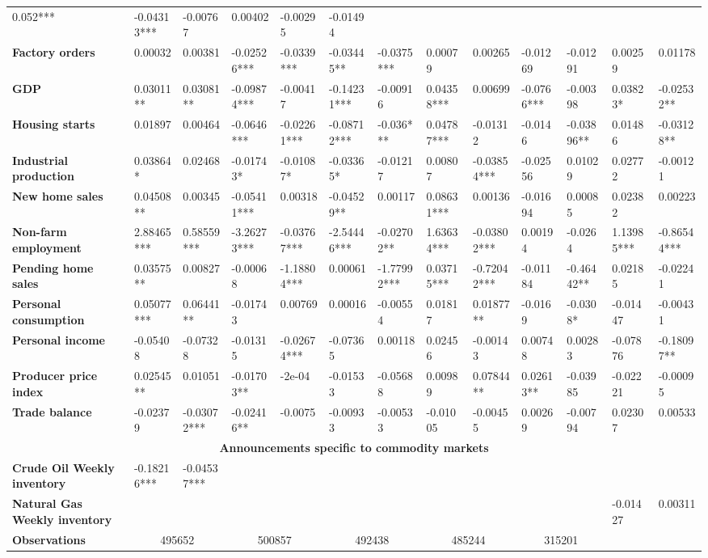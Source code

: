 \begin{sidewaystable}
{\begin{tabular}{@{}lllllllllllll@{}}
0.052*** & -0.04313*** & -0.00767 & 0.00402 & -0.00295 & -0.01494 \\ \textbf{Factory orders}& 0.00032 & 0.00381 & -0.02526*** & -0.0339*** & -0.03445** & -0.0375*** & 0.00079 & 0.00265 & -0.01269 & -0.01291 & 0.00259 & 0.01178 \\ \textbf{GDP}& 0.03011** & 0.03081** & -0.09874*** & -0.00417 & -0.14231*** & -0.00916 & 0.04358*** & 0.00699 & -0.0766*** & -0.00398 & 0.03823* & -0.02532** \\ \textbf{Housing starts}& 0.01897 & 0.00464 & -0.0646*** & -0.02261*** & -0.08712*** & -0.036*** & 0.04787*** & -0.01312 & -0.0146 & -0.03896** & 0.01486 & -0.03128** \\ \textbf{Industrial production}& 0.03864* & 0.02468 & -0.01743* & -0.01087* & -0.03365* & -0.01217 & 0.00807 & -0.03854*** & -0.02556 & 0.01029 & 0.02772 & -0.00121 \\ \textbf{New home sales}& 0.04508** & 0.00345 & -0.05411*** & 0.00318 & -0.04529** & 0.00117 & 0.08631*** & 0.00136 & -0.01694 & 0.00085 & 0.02382 & 0.00223 \\ \textbf{Non-farm employment}& 2.88465*** & 0.58559*** & -3.26273*** & -0.03767*** & -2.54446*** & -0.02702** & 1.63634*** & -0.03802*** & 0.00194 & -0.0264 & 1.13985*** & -0.86544*** \\ \textbf{Pending home sales}& 0.03575** & 0.00827 & -0.00068 & -1.18804*** & 0.00061 & -1.77992*** & 0.03715*** & -0.72042*** & -0.01184 & -0.46442** & 0.02185 & -0.02241 \\ \textbf{Personal consumption}& 0.05077*** & 0.06441** & -0.01743 & 0.00769 & 0.00016 & -0.00554 & 0.01817 & 0.01877** & -0.0169 & -0.0308* & -0.01447 & -0.00431 \\ \textbf{Personal income}& -0.05408 & -0.07328 & -0.01315 & -0.02674*** & -0.07365 & 0.00118 & 0.02456 & -0.00143 & 0.00748 & 0.00283 & -0.07876 & -0.18097** \\ \textbf{Producer price index}& 0.02545** & 0.01051 & -0.01703** & -2e-04 & -0.01533 & -0.05688 & 0.00989 & 0.07844** & 0.02613** & -0.03985 & -0.02221 & -0.00095 \\ \textbf{Trade balance}& -0.02379 & -0.03072*** & -0.02416** & -0.0075 & -0.00933 & -0.00533 & -0.01005 & -0.00455 & 0.00269 & -0.00794 & 0.02307 & 0.00533 \\  \midrule \multicolumn{13}{c}{\textbf{Announcements specific to commodity markets}} \\ \midrule \textbf{Crude Oil Weekly inventory}& -0.18216*** & -0.04537*** &  &  &  &  &  &  &  &  &  &  \\ \textbf{Natural Gas Weekly inventory}&  &  &  &  &  &  &  &  &  &  & -0.01427 & 0.00311 \\  \midrule \textbf{Observations}             &\multicolumn{2}{c}{ 495652 }                                                 & \multicolumn{2}{c}{ 500857 }                                                 & \multicolumn{2}{c}{ 492438 }                                                 & \multicolumn{2}{c}{ 485244 }                                                 & \multicolumn{2}{c}{ 315201 }                                                   & 
\end{tabular}}
\end{sidewaystable}
